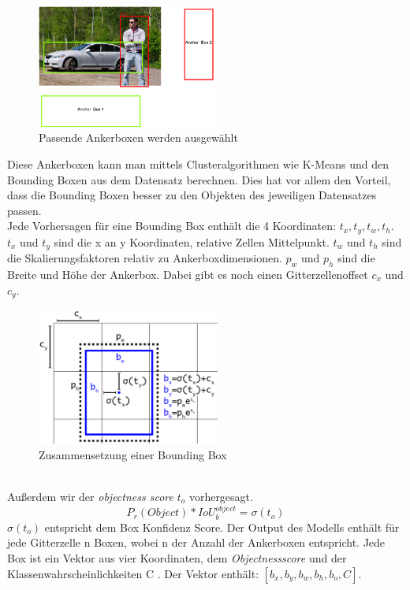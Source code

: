 \documentclass[conference]{IEEEtran}
\begin{document}
	\begin{figure}[!h]
		\begin{center}
			\includegraphics[width=6cm]{Media/Ankerboxen.png}
			\caption{Passende Ankerboxen werden ausgewählt \cite{b0}}
			\label{Anker}
		\end{center}
	\end{figure}
	Diese Ankerboxen kann man mittels Clusteralgorithmen wie K-Means \cite{kmeans} und den Bounding Boxen aus dem Datensatz berechnen. Dies hat vor allem den Vorteil, dass die Bounding Boxen besser zu den Objekten des jeweiligen Datensatzes passen.\\
	Jede Vorhersagen für eine Bounding Box enthält die 4 Koordinaten: $t_x, t_y, t_w, t_h$. $t_x$ und $ t_y$ sind die x an y Koordinaten, relative Zellen Mittelpunkt. $t_w$ und $ t_h$ sind die Skalierungsfaktoren relativ zu Ankerboxdimensionen. $p_w$ und $p_h$ sind die Breite und Höhe der Ankerbox. Dabei gibt es noch einen Gitterzellenoffset $c_x$ und $c_y$.
	\begin{figure}[!h]
		\begin{center}
			\includegraphics[width=6cm]{Media/YoloV3PredictionBox.png}
			\caption{Zusammensetzung einer Bounding Box \cite{b3}}
			\label{PredictionBox}
		\end{center}
	\end{figure}\\
	Außerdem wir der \textit{objectness score} $t_o$ vorhergesagt.
	\[ P_r(Object)*IoU_{b}^{object} = \sigma(t_o) \]
	$\sigma(t_o)$ entspricht dem Box Konfidenz Score.
	Der Output des Modells enthält für jede Gitterzelle n Boxen, wobei n der Anzahl der Ankerboxen entspricht. Jede Box ist ein Vektor aus vier Koordinaten, dem \textit{Objectnessscore} und der Klassenwahrscheinlichkeiten C \cite{b3}. Der Vektor enthält: $[b_x,b_y,b_w,b_h, b_o, C]$.
\end{document}
